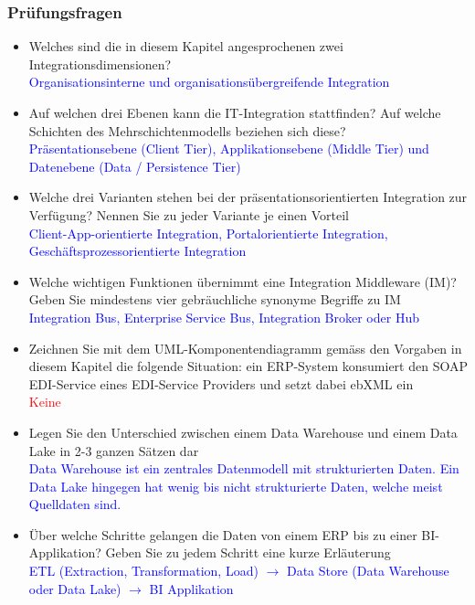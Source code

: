 \subsubsection{Prüfungsfragen}

\begin{itemize}
    \item Welches sind die in diesem Kapitel angesprochenen zwei Integrationsdimensionen? \\
    \textcolor{blue}{Organisationsinterne und organisationsübergreifende Integration}
    \item Auf welchen drei Ebenen kann die IT-Integration stattfinden? Auf welche Schichten
    des Mehrschichtenmodells beziehen sich diese? \\
    \textcolor{blue}{Präsentationsebene (Client Tier), Applikationsebene (Middle Tier) und Datenebene (Data / Persistence Tier)}
    \item Welche drei Varianten stehen bei der präsentationsorientierten
    Integration zur Verfügung? Nennen Sie zu jeder Variante je einen Vorteil \\
    \textcolor{blue}{Client-App-orientierte Integration, Portalorientierte Integration, Geschäftsprozessorientierte Integration}
    \item Welche wichtigen Funktionen übernimmt eine Integration Middleware (IM)? Geben Sie mindestens vier gebräuchliche synonyme Begriffe zu IM \\
    \textcolor{blue}{Integration Bus, Enterprise Service Bus, Integration Broker oder Hub}
    \item Zeichnen Sie mit dem UML-Komponentendiagramm gemäss den Vorgaben in diesem Kapitel die folgende Situation: ein ERP-System konsumiert den SOAP EDI-Service eines EDI-Service Providers und setzt dabei ebXML ein \\
    \textcolor{red}{Keine}
    \item Legen Sie den Unterschied zwischen einem Data Warehouse und einem Data Lake in 2-3 ganzen Sätzen dar \\
    \textcolor{blue}{Data Warehouse ist ein zentrales Datenmodell mit strukturierten Daten. Ein Data Lake hingegen hat wenig bis nicht strukturierte Daten, welche meist Quelldaten sind.}
    \item Über welche Schritte gelangen die Daten von einem ERP bis zu einer BI-Applikation? Geben Sie zu jedem Schritt eine kurze Erläuterung \\
    \textcolor{blue}{ETL (Extraction, Transformation, Load) $\rightarrow$ Data Store (Data Warehouse oder Data Lake) $\rightarrow$ BI Applikation}
\end{itemize}
